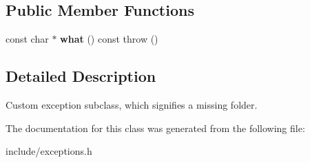\subsection*{Public Member Functions}
\begin{DoxyCompactItemize}
\item 
\mbox{\label{classFolderNotFoundError_a241dcd046686f65f53bbd4c5a7c21ac5}} 
const char $\ast$ {\bfseries what} () const  throw ()
\end{DoxyCompactItemize}


\subsection{Detailed Description}
Custom exception subclass, which signifies a missing folder. 

The documentation for this class was generated from the following file\+:\begin{DoxyCompactItemize}
\item 
include/exceptions.\+h\end{DoxyCompactItemize}

